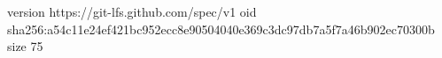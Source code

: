 version https://git-lfs.github.com/spec/v1
oid sha256:a54c11e24ef421bc952ecc8e90504040e369c3dc97db7a5f7a46b902ec70300b
size 75
